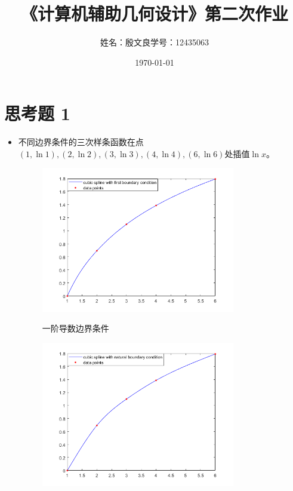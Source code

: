 \documentclass[utf8]{ctexart}
\title{《计算机辅助几何设计》第二次作业}
\author{姓名：殷文良\qquad 学号：12435063}
\date{\today}
\begin{document}
\maketitle
{}

\section*{思考题 1}
\begin{itemize}
    \item 不同边界条件的三次样条函数在点$(1,\ln{1}),(2,\ln{2}),(3,\ln{3}),(4,\ln{4}),(6,\ln{6})$处插值$\ln{x}$。
    \begin{figure}[H]
        \centering
        \includegraphics[width=0.8\textwidth]{cubic_log_first.png}
        \label{fig: cubic_log_first}
        \caption{一阶导数边界条件}
    \end{figure}
    \begin{figure}[H]
        \centering
        \includegraphics[width=0.8\textwidth]{cubic_log_natural.png}

\end{figure}
\end{itemize}
\end{document}
